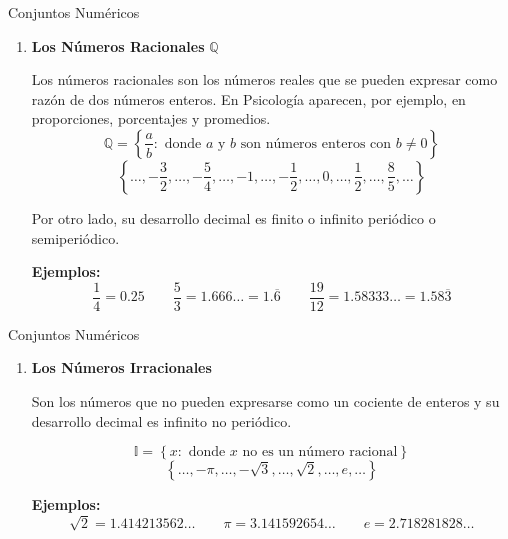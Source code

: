\documentclass[aspectratio=169,handout,11pt]{beamer}
\begin{document}
	\begin{frame}{Conjuntos Numéricos}
		\begin{block}{}
			\begin{enumerate}
				\item[3.] \textbf{Los Números Racionales} $\mathbb{Q}$
				
				Los números racionales son los números reales que se pueden expresar como razón de dos números enteros. En Psicología aparecen, por ejemplo, en proporciones, porcentajes y promedios.
				\[
				\mathbb{Q}=
				\left\{
				\frac{a}{b}:\text{ donde } a \text{ y } b \text{ son números enteros con } b\neq 0
				\right\}
				\]
				\[
				\left\{
				\ldots,-\frac{3}{2},\ldots,-\frac{5}{4},\ldots,-1,\ldots,-\frac{1}{2},\ldots,0,\ldots,\frac{1}{2},\ldots,\frac{8}{5},\ldots
				\right\}
				\]
				
				Por otro lado, su desarrollo decimal es finito o infinito periódico o semiperiódico.
				
				\textbf{Ejemplos:}
				\[
				\frac{1}{4}=0.25
				\qquad
				\frac{5}{3}=1.666\ldots = 1.\overline{6}
				\qquad
				\frac{19}{12}=1.58333\ldots = 1.58\overline{3}
				\]
			\end{enumerate}
		\end{block}
	\end{frame}
	
	\begin{frame}{Conjuntos Numéricos}
		\begin{block}{}
			\begin{enumerate}
				\item[4.] \textbf{Los Números Irracionales}
				
				Son los números que no pueden expresarse como un cociente de enteros y su desarrollo decimal es infinito no periódico.
				
				\[
				\mathbb{I}=
				\left\{
				x:\text{ donde } x \text{ no es un número racional}
				\right\}
				\]
				\[
				\left\{
				\ldots,-\pi,\ldots,-\sqrt{3},\ldots,\sqrt{2},\ldots,e,\ldots
				\right\}
				\]
				
				\textbf{Ejemplos:}
				\[
				\sqrt{2}=1.414213562\ldots
				\qquad
				\pi=3.141592654\ldots
				\qquad
				e=2.718281828\ldots
				\]
			\end{enumerate}
		\end{block}
	\end{frame}
	
\end{document}
